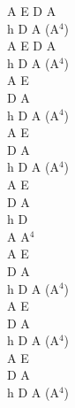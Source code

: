 \documentclass[a5paper, 10pt]{book}
\begin{document}
\begin{minipage}[t]{0.25\textwidth}
A E D A\\
h D A (A$^4$)\\
A E D A\\
h D A (A$^4$)\\

A E\\
D A\\
h D A (A$^4$)\\

A E\\
D A\\
h D A (A$^4$)\\

A E\\
D A\\
h D\\
A A$^4$\\
A E\\
D A\\
h D A (A$^4$)\\

A E\\
D A\\
h D A (A$^4$)\\

A E\\
D A\\
h D A (A$^4$)\\
\end{minipage}

\newpage
\end{document}
